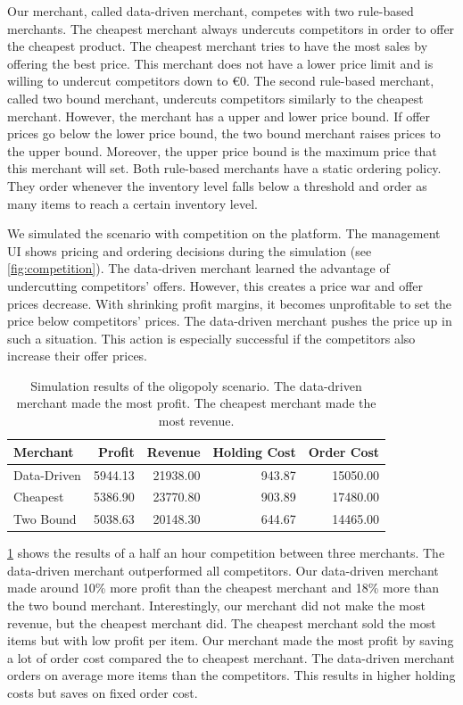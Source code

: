 Our merchant, called data-driven merchant, competes with two rule-based merchants.
The cheapest merchant always undercuts competitors in order to offer the cheapest product.
The cheapest merchant tries to have the most sales by offering the best price.
This merchant does not have a lower price limit and is willing to undercut competitors down to €0.
The second rule-based merchant, called two bound merchant, undercuts competitors similarly to the cheapest merchant.
However, the merchant has a upper and lower price bound.
If offer prices go below the lower price bound, the two bound merchant raises prices to the upper bound.
Moreover, the upper price bound is the maximum price that this merchant will set.
Both rule-based merchants have a static ordering policy.
They order whenever the inventory level falls below a threshold and order as many items to reach a certain inventory level.

We simulated the scenario with competition on the \pricewars platform.
The management UI shows pricing and ordering decisions during the simulation (see \cref{fig:competition}).
The data-driven merchant learned the advantage of undercutting competitors' offers.
However, this creates a price war and offer prices decrease.
With shrinking profit margins, it becomes unprofitable to set the price below competitors' prices.
The data-driven merchant pushes the price up in such a situation.
This action is especially successful if the competitors also increase their offer prices.

\begin{table}[t]
	\centering
	\begin{tabular}{lrrrr}
		\toprule
		Merchant & Profit & Revenue & Holding Cost & Order Cost \\
		\midrule
		Data-Driven & 5944.13 & 21938.00 & 943.87 & 15050.00 \\
		Cheapest & 5386.90 & 23770.80 & 903.89 & 17480.00 \\
		Two Bound & 5038.63 & 20148.30 & 644.67 & 14465.00 \\
		\bottomrule
	\end{tabular}
	\caption{Simulation results of the oligopoly scenario. The data-driven merchant made the most profit. The cheapest merchant made the most revenue.}
	\label{tab:competition}
\end{table}

\cref{tab:competition} shows the results of a half an hour competition between three merchants.
The data-driven merchant outperformed all competitors.
Our data-driven merchant made around 10\% more profit than the cheapest merchant and 18\% more than the two bound merchant.
Interestingly, our merchant did not make the most revenue, but the cheapest merchant did.
The cheapest merchant sold the most items but with low profit per item.
Our merchant made the most profit by saving a lot of order cost compared the to cheapest merchant.
The data-driven merchant orders on average more items than the competitors.
This results in higher holding costs but saves on fixed order cost.

